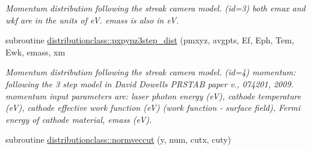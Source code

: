 \begin{DoxyCompactItemize}
\begin{DoxyCompactList}\small\item\em Momentum distribution following the streak camera model. (id=3) both emax and wkf are in the units of eV. emass is also in eV. \end{DoxyCompactList}\item 
subroutine \mbox{\hyperlink{namespacedistributionclass_aaeb585c7c5a8664f047fb95fc7721059}{distributionclass\+::pxpypz3step\+\_\+dist}} (pmxyz, avgpts, Ef, Eph, Tem, Ewk, emass, xm
\begin{DoxyCompactList}\small\item\em Momentum distribution following the streak camera model. (id=4) momentum\+: following the 3 step model in David Dowell\textquotesingle{}s P\+R\+S\+T\+AB paper v., 074201, 2009. momentum input parameters are\+: laser photon energy (eV), cathode temperature (eV), cathode effective work function (eV) (work function -\/ surface field), Fermi energy of cathode material, emass (eV). \end{DoxyCompactList}\item 
subroutine \mbox{\hyperlink{namespacedistributionclass_ae604d1dc6d7f92f0c37e00fb504d38fa}{distributionclass\+::normveccut}} (y, num, cutx, cuty)
\end{DoxyCompactItemize}

